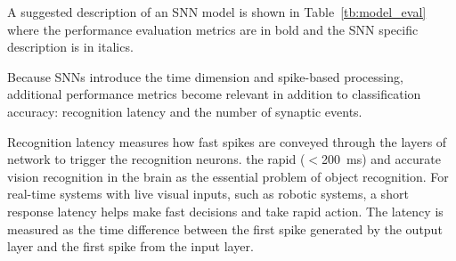 A suggested description of an SNN model is shown in Table~\ref{tb:model_eval} where the performance evaluation metrics are in bold and the SNN specific description is in italics.
\DIFdelbegin %

\DIFdelend Because SNNs introduce the time dimension and spike-based processing, additional performance metrics become relevant in addition to classification accuracy: recognition latency and the number of synaptic events.
\DIFaddbegin 

\DIFaddend Recognition latency measures how fast spikes are conveyed through the layers of network to trigger the recognition neurons.
\DIFdelbegin {}\DIFdelend \DIFaddbegin {}\DIFaddend the rapid ($<$200~ms) and accurate vision recognition in the brain as the essential problem of object recognition.
For real-time systems with live visual inputs, such as robotic systems, a short response latency helps make fast decisions and take rapid action.
The latency is measured as the time difference between the first spike generated by the output layer and the first spike from the input layer.
\DIFdelbegin {}\DIFdelend \DIFaddbegin 

